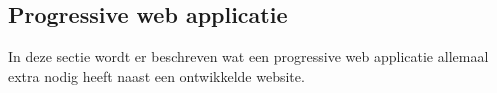 \chapter{}
\label{ch:stand-van-zaken}





\section{Progressive web applicatie}
In deze sectie wordt er beschreven wat een progressive web applicatie allemaal extra nodig heeft naast een ontwikkelde website. \cite{PWA_EXTRA_FEATURES} \cite{PWA_EXTRA_FEATURES_2}

